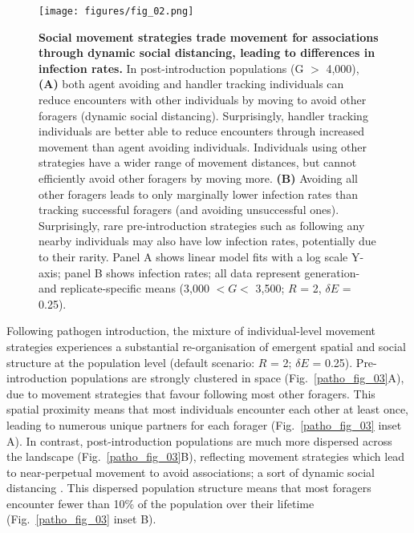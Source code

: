 \begin{figure}[!h]
    \centering
    \texttt{[image: figures/fig\_02.png]}
    \caption{
        \textbf{Social movement strategies trade movement for associations through dynamic social distancing, leading to differences in infection rates.}
        In post-introduction populations (G $>$ 4,000), \textbf{(A)} both agent avoiding and handler tracking individuals can reduce encounters with other individuals by moving to avoid other foragers (dynamic social distancing).
        Surprisingly, handler tracking individuals are better able to reduce encounters through increased movement than agent avoiding individuals.
        Individuals using other strategies have a wider range of movement distances, but cannot efficiently avoid other foragers by moving more.
        \textbf{(B)} Avoiding all other foragers leads to only marginally lower infection rates than tracking successful foragers (and avoiding unsuccessful ones).
        Surprisingly, rare pre-introduction strategies such as following any nearby individuals may also have low infection rates, potentially due to their rarity.
        Panel A shows linear model fits with a log scale Y-axis; panel B shows infection rates; all data represent generation- and replicate-specific means (3,000 $< G <$ 3,500; $R$ = 2, $\delta E$ = 0.25).
    }\label{patho_fig_02}
\end{figure}

Following pathogen introduction, the mixture of individual-level movement strategies experiences a substantial re-organisation of emergent spatial and social structure at the population level (default scenario: $R$ = 2; $\delta E$ = 0.25).
Pre-introduction populations are strongly clustered in space (Fig.~\ref{patho_fig_03}A), due to movement strategies that favour following most other foragers.
This spatial proximity means that most individuals encounter each other at least once, leading to numerous unique partners for each forager (Fig.~\ref{patho_fig_03} inset A).
In contrast, post-introduction populations are much more dispersed across the landscape (Fig.~\ref{patho_fig_03}B), reflecting movement strategies which lead to near-perpetual movement to avoid associations; a sort of dynamic social distancing \citep{pusceddu2021}.
This dispersed population structure means that most foragers encounter fewer than 10\% of the population over their lifetime (Fig.~\ref{patho_fig_03} inset B).

